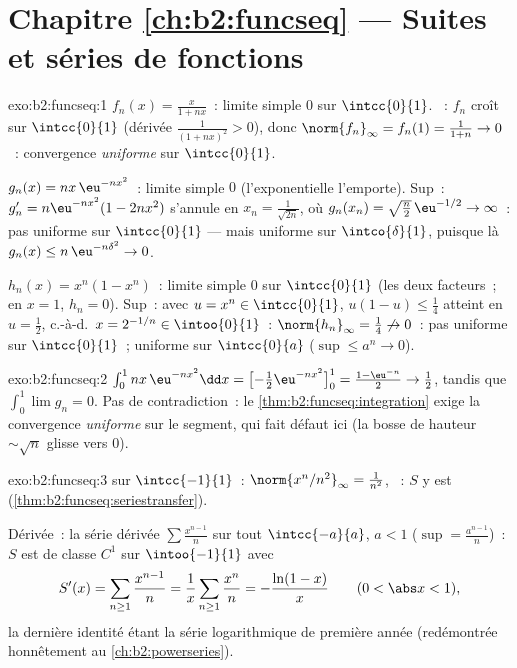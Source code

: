 \section*{Chapitre \ref{ch:b2:funcseq} --- Suites et séries de
fonctions}

\begin{solution}{exo:b2:funcseq:1}
$f_n(x) = \frac{x}{1 + nx}$~: limite simple $0$ sur $\intcc{0}{1}$.
~: $f_n$ croît sur $\intcc{0}{1}$ (dérivée
$\frac{1}{(1+nx)^2} > 0$), donc $\norm{f_n}_\infty = f_n(1) =
\frac{1}{1+n} \to 0$~: convergence \emph{uniforme} sur $\intcc{0}{1}$.

$g_n(x) = nx\,\eu^{-nx^2}$~: limite simple $0$ (l'exponentielle
l'emporte). Sup~: $g_n' = n\eu^{-nx^2}(1 - 2nx^2)$ s'annule en $x_n =
\frac{1}{\sqrt{2n}}$, où $g_n(x_n) = \sqrt{\frac n2}\,\eu^{-1/2}
\to \infty$~: pas uniforme sur $\intcc{0}{1}$ --- mais uniforme sur
$\intco{\delta}{1}$, puisque là $g_n(x) \leq n\,\eu^{-n\delta^2}
\to 0$.

$h_n(x) = x^n(1 - x^n)$~: limite simple $0$ sur $\intcc{0}{1}$
(les deux facteurs~; en $x = 1$, $h_n = 0$). Sup~: avec $u = x^n \in
\intcc{0}{1}$, $u(1-u) \leq \frac14$ atteint en $u = \frac12$,
c.-à-d.\ $x = 2^{-1/n} \in \intoo{0}{1}$~: $\norm{h_n}_\infty =
\frac14 \not\to 0$~: pas uniforme sur $\intcc{0}{1}$~; uniforme sur
$\intcc{0}{a}$ ($\sup \leq a^n \to 0$).
\end{solution}

\begin{solution}{exo:b2:funcseq:2}
$\int_0^1 nx\,\eu^{-nx^2}\dd x = \bigl[-\tfrac12
\eu^{-nx^2}\bigr]_0^1 = \frac{1 - \eu^{-n}}{2} \to \frac12$, tandis
que $\int_0^1 \lim g_n = 0$. Pas de contradiction~: le
\cref{thm:b2:funcseq:integration} exige la convergence \emph{uniforme}
sur le segment, qui fait défaut ici (la bosse de hauteur
$\sim\sqrt n$ glisse vers $0$).
\end{solution}

\begin{solution}{exo:b2:funcseq:3}
 sur $\intcc{-1}{1}$~: $\norm{x^n/n^2}_\infty =
\frac{1}{n^2}$, ~: $S$ y est 
(\cref{thm:b2:funcseq:seriestransfer}).

Dérivée~: la série dérivée $\sum \frac{x^{n-1}}{n}$ 
 sur tout $\intcc{-a}{a}$, $a < 1$ ($\sup =
\frac{a^{n-1}}{n}$)~: $S$ est de classe $C^1$ sur $\intoo{-1}{1}$ avec
\[
S'(x) = \sum_{n\geq1} \frac{x^{n-1}}{n} = \frac1x \sum_{n\geq1}
\frac{x^n}{n} = -\frac{\ln(1 - x)}{x}
\qquad (0 < \abs x < 1),
\]
la dernière identité étant la série logarithmique de première année
(redémontrée honnêtement au \cref{ch:b2:powerseries}).
\end{solution}

